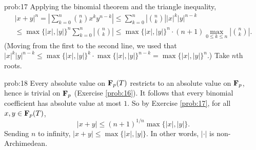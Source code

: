 \begin{sol}{prob:17} Applying the binomial theorem and the triangle inequality,
\begin{multline*} |x+y|^n = \left|\sum_{k=0}^{n} \binom{n}{k} x^{k} y^{n-k}\right| \le  \sum_{k=0}^{n} \left|\binom{n}{k}\right| |x|^k |y|^{n-k} \\
\le \max\{|x|,|y|\}^{n} \sum_{k=0}^{n} \left|\binom{n}{k}\right| \le \max\{|x|,|y|\}^{n} \cdot (n+1) \max_{0\le k \le n}\left|\binom{n}{k}\right|. \end{multline*}
(Moving from the first to the second line, we used that $|x|^k |y|^{n-k} \le \max\{|x|,|y|\}^k \cdot \max\{|x|,|y|\}^{n-k} = \max\{|x|,|y|\}^n$.) 
Take $n$th roots.
\end{sol}


\begin{sol}{prob:18} Every absolute value on $\mathbf{F}_p(T)$ restricts to an absolute value on $\mathbf{F}_p$, hence is trivial on $\mathbf{F}_p$ (Exercise \ref{prob:16}). It follows that every binomial coefficient has absolute value at most $1$. So by Exercise \ref{prob:17}, for all $x, y \in \mathbf{F}_p(T)$, 
\[ |x+y| \le (n+1)^{1/n} \max\{|x|,|y|\}. \] Sending $n$ to infinity, $|x+y|\le \max\{|x|,|y|\}$. In other words, $|\cdot|$ is non-Archimedean.
\end{sol}

